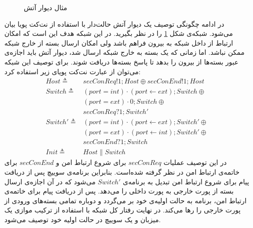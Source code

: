 \documentclass[
msc,
irfonts
]{./tex/tehran-thesis}
\newcommand{\پ}{پروژه/پایان‌نامه/رساله }
\theoremstyle{definition}
\theoremstyle{theorem}
\theoremstyle{definition}
\numberwithin{algorithm}{chapter}
\newcommand{\la}{\leftarrow}
\newcommand{\lf}[1]{\LTRfootnote{#1}}
\begin{document}
\begin{figure}
    \centering
    \caption{مثال دیوار آتش}
    \label{fig:dynetkat:firewall}
\end{figure}
در ادامه چگونگی توصیف یک دیوار آتش\lf{Firewall}
حالت‌دار\lf{Stateful}
با استفاده از نت‌کت پویا بیان می‌شود.
شبکه‌ی شکل
\ref{fig:dynetkat:firewall}
را در نظر بگیرید.
در این شبکه هدف این است که امکان ارتباط از داخل شبکه به بیرون فراهم باشد ولی امکان ارسال بسته از خارج شبکه ممکن نباشد.
اما زمانی که یک بسته به خارج شبکه ارسال شد، دیوار آتش باید اجازه‌ی عبور بسته‌ها از بیرون را بدهد تا پاسخ بسته‌ها دریافت شوند.
برای توصیف این شبکه می‌توان از عبارت نت‌کت پویای زیر استفاده کرد:
\begin{align*}
    Host  \triangleq   & secConReq!1;Host \oplus secConEnd!1;Host        \\
    Switch \triangleq  & (port = int) \cdot (port \la ext);Switch \oplus \\
                       & (port = ext)\cdot 0 ; Switch \oplus             \\
                       & secConReq?1;Switch'                             \\
    Switch' \triangleq & (port =int) \cdot (port \la ext);Switch' \oplus \\
                       & (port=ext)\cdot(port\la int);Switch' \oplus     \\
                       & secConEnd?1;Switch                              \\
    Init \triangleq    & Host \parallel Switch
\end{align*}
در این توصیف عملیات 
$secConReq$
برای شروع ارتباط امن و
$secConEnd$
برای خاتمه‌ی ارتباط امن در نظر گرفته شده‌است.
بنابراین برنامه‌ی سوییچ پس از دریافت پیام برای شروع ارتباط امن تبدیل به برنامه‌ی 
$Switch'$
می‌شود که در آن اجازه‌ی ارسال بسته از پورت خارجی به پورت داخلی را می‌دهد.
پس از دریافت پیام برای خاتمه‌ی ارتباط امن، برنامه به حالت اولیه‌ی خود بر می‌گردد و دوباره تمامی بسته‌های ورودی از پورت خارجی را رها می‌کند.
در نهایت رفتار کل شبکه با استفاده از ترکیب موازی یک میزبان و یک سوییچ در حالت اولیه خود توصیف می‌شود.
\end{document}
